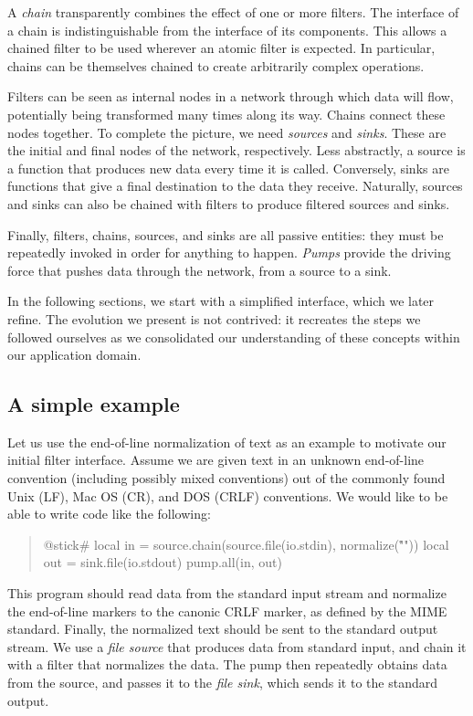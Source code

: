 \documentclass[10pt]{article}
\begin{document}
A \emph{chain} transparently combines the effect of one or
more filters. The interface of a chain is 
indistinguishable from the interface of its components.
This  allows a chained filter to be used wherever an atomic
filter is expected. In particular, chains can be 
themselves chained to create arbitrarily complex operations.

Filters can be seen as internal nodes in a network through
which data will flow, potentially being transformed many
times along its way.  Chains connect these nodes together.
To complete the picture, we need \emph{sources} and
\emph{sinks}. These are the initial and final nodes of the
network, respectively.  Less abstractly, a source is a
function that produces new data every time it is called.
Conversely, sinks are functions that give a final
destination to the data they receive.  Naturally, sources
and sinks can also be chained with filters to produce
filtered sources and sinks.

Finally, filters, chains, sources, and sinks are all passive
entities: they must be repeatedly invoked in order for
anything to happen.  \emph{Pumps} provide the driving force
that pushes data through the network, from a source to a
sink.

In the following sections, we start with a simplified
interface, which we later refine. The evolution we present
is not contrived: it recreates the steps we followed
ourselves as we consolidated our understanding of these
concepts within our application domain. 

\subsection{A simple example}

Let us use the end-of-line normalization of text as an
example to motivate our initial filter interface. 
Assume we are given text in an unknown end-of-line
convention (including possibly mixed conventions) out of the
commonly found Unix (LF), Mac OS (CR), and DOS (CRLF)
conventions. We would like to be able to write code like the
following:
\begin{quote}
\begin{lua}
@stick#
local in = source.chain(source.file(io.stdin), normalize("\r\n"))
local out = sink.file(io.stdout)
pump.all(in, out)
%
\end{lua}
\end{quote}

This program should read data from the standard input stream
and normalize the end-of-line markers to the canonic CRLF
marker, as defined by the MIME standard. Finally, the
normalized text should be sent to the standard output
stream.  We use a \emph{file source} that produces data from
standard input, and chain it with a filter that normalizes
the data. The pump then repeatedly obtains data from the
source, and passes it to the \emph{file sink}, which sends
it to the standard output.
\end{document}
